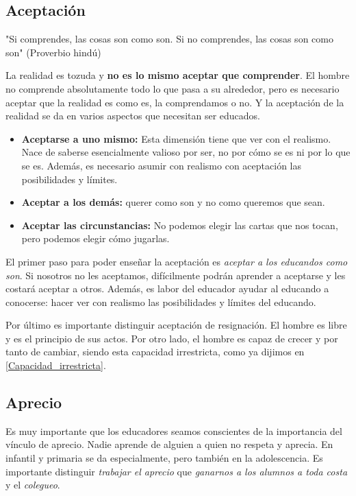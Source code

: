 \documentclass[palatino]{apuntesURJC}
\begin{document}
	\subsection{Aceptación}

	"Si comprendes, las cosas son como son. Si no comprendes, las cosas son como son" (Proverbio hindú)

	La realidad es tozuda y \textbf{no es lo mismo aceptar que comprender}. 
	El hombre no comprende absolutamente todo lo que pasa a su alrededor, pero es necesario aceptar que la realidad es como es, la comprendamos o no.
	Y la aceptación de la realidad se da en varios aspectos que necesitan ser educados.

	\begin{itemize}
		\item \textbf{Aceptarse a uno mismo:} Esta dimensión tiene que ver con el realismo. 
		Nace de saberse esencialmente valioso por ser, no por cómo se es ni por lo que se es.
		Además, es necesario asumir con realismo con aceptación las posibilidades y límites.

		\item \textbf{Aceptar a los demás:} querer como son y no como queremos que sean.

		\item \textbf{Aceptar las circunstancias:} No podemos elegir las cartas que nos tocan, pero podemos elegir cómo jugarlas.
	\end{itemize}

	El primer paso para poder enseñar la aceptación es \textit{aceptar a los educandos como son}.
	Si nosotros no les aceptamos, difícilmente podrán aprender a aceptarse y les costará aceptar a otros.
	Además, es labor del educador ayudar al educando a conocerse: hacer ver con realismo las posibilidades y límites del educando. 

	Por último es importante distinguir aceptación de resignación. El hombre es libre y es el principio de sus actos.
	Por otro lado, el hombre es capaz de crecer y por tanto de cambiar, siendo esta capacidad irrestricta, como ya dijimos en \ref{Capacidad_irrestricta}.
	


	\subsection{Aprecio}

Es muy importante que los educadores seamos conscientes de la importancia del vínculo de aprecio. 
%
Nadie aprende de alguien a quien no respeta y aprecia. 
%
En infantil y primaria se da especialmente, pero también en la adolescencia.
%
Es importante distinguir \textit{trabajar el aprecio} que \textit{ganarnos a los alumnos a toda costa} y el \textit{colegueo}.
\end{document}
